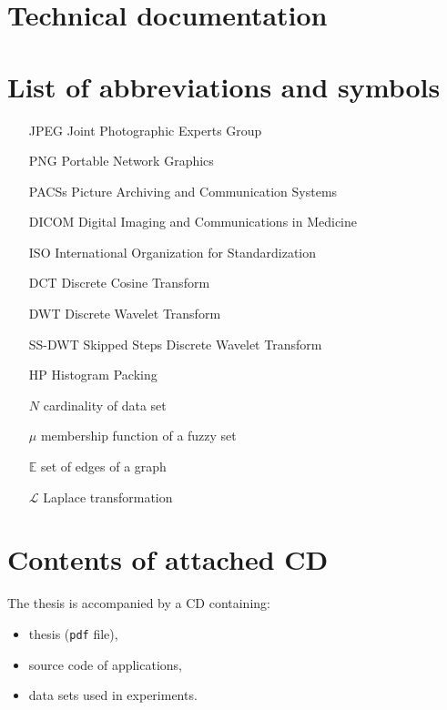 \chapter*{Technical documentation}

\chapter*{List of abbreviations and symbols}

\begin{itemize}
\item[JPEG] Joint Photographic Experts Group
\item[PNG] Portable Network Graphics
\item[PACSs] Picture Archiving and Communication Systems
\item[DICOM] Digital Imaging and Communications in Medicine
\item[ISO] International Organization for Standardization
\item[DCT] Discrete Cosine Transform
\item[DWT] Discrete Wavelet Transform
\item[SS-DWT] Skipped Steps Discrete Wavelet Transform
\item[HP] Histogram Packing 
\item[$N$] cardinality of data set
\item[$\mu$] membership function of a fuzzy set
\item[$\mathbb{E}$] set of edges of a graph
\item[$\mathcal{L}$] Laplace transformation
\end{itemize}

\chapter*{Contents of attached CD}

The thesis is accompanied by a CD containing:
\begin{itemize}
\item thesis (\texttt{pdf} file),
\item source code of applications,
\item data sets used in experiments.
\end{itemize}
